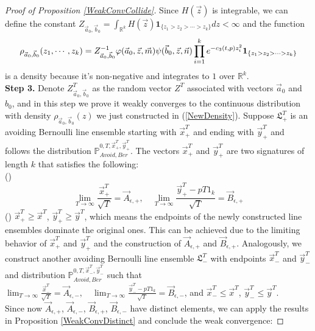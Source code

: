 \begin{proof}[Proof of Proposition \ref{WeakConvCollide}]
Since $H(\vec{z})$ is integrable, we can define the constant $Z_{\vec{a}_{0},\vec{b}_{0}}=\int_{\mathbb{R}^{k}}H(\vec{z})\mathbf{1}_{\{z_1>z_2>\cdots>z_{k}\}}dz<\infty$ and the function \begin{align}{\label{NewDensity}}
	\rho_{\vec{a}_{0},\vec{b}_{0}}(z_{1},\cdots,z_{k})=Z_{\vec{a}_{0},\vec{b}_{0}}^{-1}\varphi(\vec{a}_{0},\vec{z},\vec{m})\psi(\vec{b}_{0},\vec{z},\vec{n})\prod_{i=1}^{k}e^{-c_{3}(t,p)z_{i}^{2}}\mathbf{1}_{\{z_1>z_2>\cdots>z_{k}\}}
\end{align}
is a density because it's non-negative and integrates to $1$ over $\mathbb{R}^{k}$.\\
\textbf{Step 3. }Denote $Z^{T}_{\vec{a}_{0},\vec{b}_{0}}$ as the random vector $Z^{T}$ associated with vectors $\vec{a}_{0}$ and $b_{0}$, and in this step we prove it weakly converges to the continuous distribution with density $\rho_{\vec{a}_{0},\vec{b}_{0}}(z)$ we just constructed in (\ref{NewDensity}). Suppose $\mathfrak{L}_{+}^{T}$ is an avoiding Bernoulli line ensemble starting with $\vec{x}^{T}_{+}$ and ending with $\vec{y}^{T}_{+}$ and follows the distribution $\mathbb{P}_{Avoid,Ber}^{0,T,\vec{x}^{T}_{+},\vec{y}^{T}_{+}}$. The vectors $\vec{x}^{T}_{+}$ and $\vec{y}^{T}_{+}$ are two signatures of length $k$ that satisfies the following:\\
()$$\lim_{T\rightarrow\infty}\frac{\vec{x}^{T}_{+}}{\sqrt{T}}=\vec{A}_{\epsilon,+},\quad \lim_{T\rightarrow\infty}\frac{\vec{y}^{T}_{+}-pT1_{k}}{\sqrt{T}}=\vec{B}_{\epsilon,+}$$
() $\vec{x}^{T}_{+}\geq \vec{x}^{T}$, $\vec{y}^{T}_{+}\geq \vec{y}^{T}$, which means the endpoints of the newly constructed line ensembles dominate the original ones. This can be achieved due to the limiting behavior of $\vec{x}^{T}_{+}$ and $\vec{y}^{T}_{+}$ and the construction of $\vec{A}_{\epsilon,+}$ and $\vec{B}_{\epsilon,+}$.
Analogously, we construct another avoiding Bernoulli line ensemble $\mathfrak{L}_{-}^{T}$ with endpoints $\vec{x}^{T}_{-}$ and $\vec{y}^{T}_{-}$ and distribution $\mathbb{P}_{Avoid,Ber}^{0,T,\vec{x}^{T}_{-},\vec{y}^{T}_{-}}$ such that $\lim_{T\rightarrow\infty}\frac{\vec{x}^{T}_{-}}{\sqrt{T}}=\vec{A}_{\epsilon,-},\quad \lim_{T\rightarrow\infty}\frac{\vec{y}^{T}_{-}-pT1_{k}}{\sqrt{T}}=\vec{B}_{\epsilon,-}$, and $\vec{x}^{T}_{-}\leq \vec{x}^{T}$, $\vec{y}^{T}_{-}\leq \vec{y}^{T}$.\\
Since now $\vec{A}_{\epsilon,+}$, $\vec{A}_{\epsilon,-}$, $\vec{B}_{\epsilon, +}$, $\vec{B}_{\epsilon,-}$ have distinct elements, we can apply the results in Proposition \ref{WeakConvDistinct} and conclude the weak convergence:

\end{proof}
